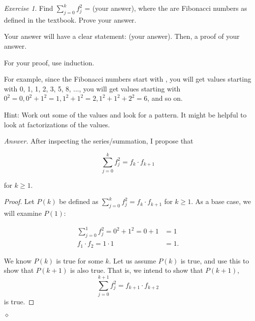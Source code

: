\documentclass[12pt,oneside]{amsart}
\theoremstyle{remark}
\newtheorem{exer}{Exercise}
\newenvironment{answer}{\bigskip\noindent\emph{Answer.}}{\hfill$\diamond$\newline}
\begin{document}
%
%
%
%
\newpage
\begin{exer}
Find $\sum_{j = 0}^k f^2_j$ = (your answer), where the are Fibonacci numbers as defined in the textbook. Prove your answer.

Your answer will have a clear statement: (your answer). Then, a proof of your answer.

For your proof, use induction.

For example, since the Fibonacci numbers start with , you will get values starting with 0, 1, 1, 2, 3, 5, 8, ..., you will get values starting with $0^2 = 0, 0^2 + 1^2 = 1, 1^2 + 1^2 = 2, 1^2 + 1^2 + 2^2 = 6$, and so on.

Hint: Work out some of the values and look for a pattern. It might be helpful to look at factorizations of the values.
\end{exer}

\begin{answer}
After inspecting the series/summation, I propose that

$$
\sum_{j = 0}^{k} f^2_j = f_k \cdot f_{k + 1}
$$

for $k \geq 1$.

\begin{proof}
Let $P(k)$ be defined as $\sum_{j = 0}^{k} f^2_j = f_k \cdot f_{k + 1}$ for $k \geq 1$. As a base case, we will examine $P(1)$:

\begin{align*}
\sum_{j = 0}^1 f^2_j = 0^2 + 1^2 = 0 + 1 &= 1 \\
f_1 \cdot f_{2} = 1 \cdot 1 &= 1.
\end{align*}

We know $P(k)$ is true for some $k$. Let us assume $P(k)$ is true, and use this to show that $P(k + 1)$ is also true. That is, we intend to show that $P(k + 1)$,
$$
\sum_{j = 0}^{k + 1} f^2_j = f_{k + 1} \cdot f_{k + 2}
$$ is true.
\end{proof}

\end{answer}
\end{document}
